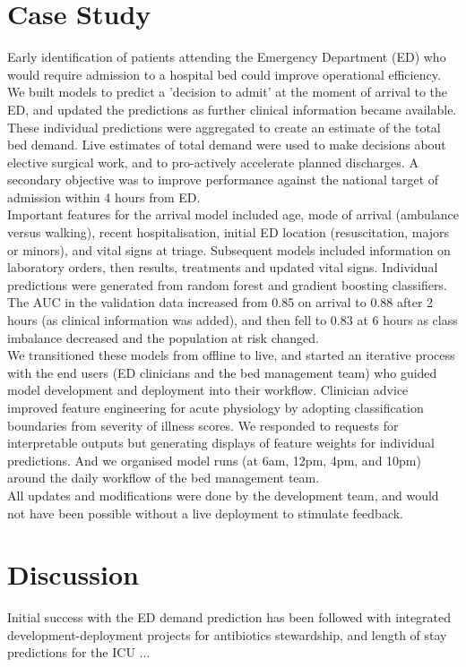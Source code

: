 \documentclass[pmlr,twocolumn,10pt]{jmlr} %
\begin{document}
\section{Case Study}
Early identification of patients attending the Emergency Department (ED) who would require admission to a hospital bed could improve operational efficiency. We built models to predict a 'decision to admit' at the moment of arrival to the ED, and updated the predictions as further clinical information became available. These individual predictions were aggregated to create an estimate of the total bed demand. Live estimates of total demand were used to make decisions about elective surgical work, and to pro-actively accelerate planned discharges. 
A secondary objective was to improve performance against the national target of admission within 4 hours from ED.\citep{kings2021} \\
Important features for the arrival model included age, mode of arrival (ambulance versus walking), recent hospitalisation, initial ED location (resuscitation, majors or minors), and vital signs at triage. Subsequent models included information on laboratory orders, then results, treatments and updated vital signs. Individual predictions were generated from random forest and gradient boosting classifiers. The AUC in the validation data increased from 0.85 on arrival to 0.88 after 2 hours (as clinical information was added), and then fell to 0.83 at 6 hours as class imbalance decreased and the population at risk changed.\\
We transitioned these models from offline to live, and started an iterative process with the end users (ED clinicians and the bed management team) who guided model development and deployment into their workflow. Clinician advice improved feature engineering for acute physiology by adopting classification boundaries from severity of illness scores. We responded to requests for interpretable outputs but generating displays of feature weights for individual predictions. And we organised model runs (at 6am, 12pm, 4pm, and 10pm) around the daily workflow of the bed management team.\\
All updates and modifications were done by the development team, and would not have been possible without a live deployment to stimulate feedback.  

\section{Discussion}
Initial success with the ED demand prediction has been followed with integrated development-deployment projects for antibiotics stewardship, and length of stay predictions for the ICU ...
\end{document}
